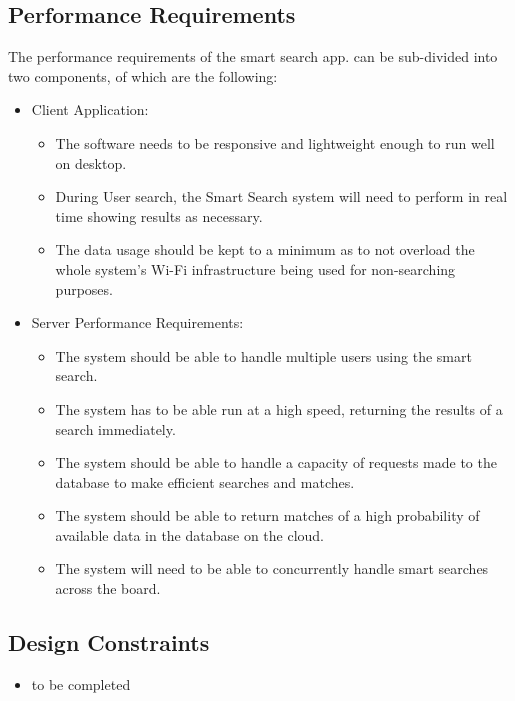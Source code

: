 \documentclass[a4paper,10pt]{article}
\begin{document}
	\subsection{Performance Requirements}
	The performance requirements of the smart search app. can be sub-divided into two components, of which are the following:
	\begin{itemize}
	\item Client Application:
		\begin{itemize}
		\item The software needs to be responsive and lightweight enough to run well on desktop.
		\item During User search, the Smart Search system will need to perform in real time showing results as necessary.
		\item The data usage should be kept to a minimum as to not overload the whole system's Wi-Fi infrastructure being used for non-searching purposes.\\
		\end{itemize}

	\item Server Performance Requirements:
		\begin{itemize}
		\item The system should be able to handle multiple users using the smart search.
		\item The system has to be able run at a high speed, returning the results of a search immediately.
		\item The system should be able to handle a capacity of requests made to the database to make efficient searches and matches. 
		\item The system should be able to return matches of a high probability of available data in the database on the cloud.
		\item The system will need to be able to concurrently handle smart searches across the board.
		\end{itemize}
	\end{itemize}

	\subsection{Design Constraints}
	\begin{itemize}
		\item to be completed
	\end{itemize}
\end{document}
